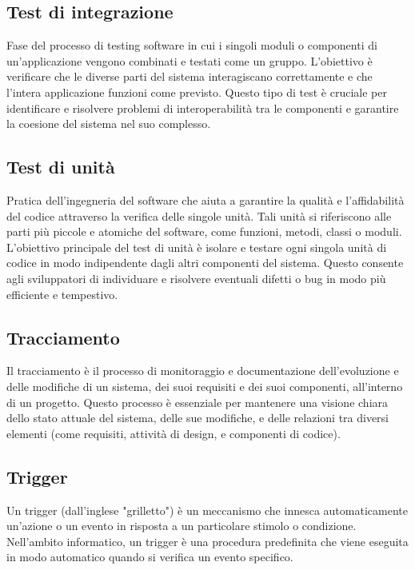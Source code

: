 \hypertarget{sec:test_integrazione}{}
\subsection*{Test di integrazione}
Fase del processo di testing software in cui i singoli moduli o componenti di un’applicazione vengono combinati e testati come un
gruppo. L’obiettivo è verificare che le diverse parti del sistema interagiscano correttamente e che l’intera applicazione funzioni
come previsto. Questo tipo di test è cruciale per identificare e risolvere problemi di interoperabilità tra le componenti e garantire
la coesione del sistema nel suo complesso.

\hypertarget{sec:test_unità}{}
\subsection*{Test di unità}
Pratica dell’ingegneria del software che aiuta a garantire la qualità e l’affidabilità del codice attraverso la verifica delle
singole unità. Tali unità si riferiscono alle parti più piccole e atomiche del software, come funzioni, metodi, classi o moduli.
L’obiettivo principale del test di unità è isolare e testare ogni singola unità di codice in modo indipendente dagli altri componenti
del sistema. Questo consente agli sviluppatori di individuare e risolvere eventuali difetti o bug in modo più efficiente e tempestivo.

\subsection*{Tracciamento}
Il tracciamento è il processo di monitoraggio e documentazione dell'evoluzione e delle modifiche di un sistema, dei suoi requisiti e dei suoi componenti, 
all’interno di un progetto. Questo processo è essenziale per mantenere una visione chiara dello stato attuale del sistema, delle sue modifiche, e delle 
relazioni tra diversi elementi (come requisiti, attività di design, e componenti di codice).

\hypertarget{sec:trigger}{}
\subsection*{Trigger}
Un trigger (dall'inglese "grilletto") è un meccanismo che innesca automaticamente un'azione o un evento in risposta a un particolare 
stimolo o condizione. Nell'ambito informatico, un trigger è una procedura predefinita che viene eseguita in modo automatico quando 
si verifica un evento specifico.

